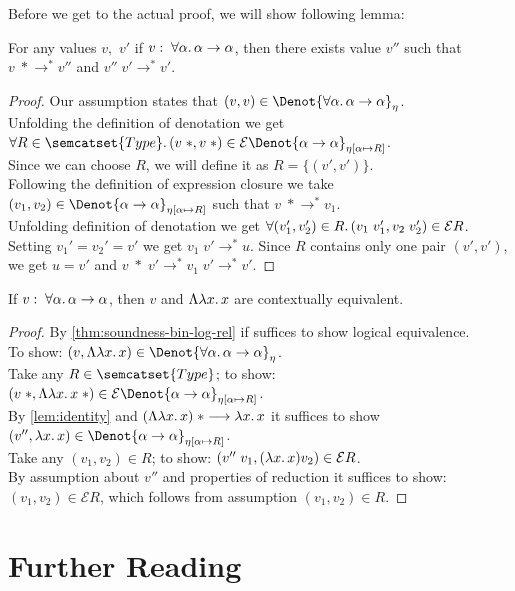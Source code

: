 Before we get to the actual proof, we will show following lemma:
\begin{lemma}\label{lem:identity}
  For any values $v,$ $v'$ if $v:\; \forall\alpha\ldotp \alpha \to \alpha$,
  then there exists value $v''$ such that $v\;* \longrightarrow^* v''$ and
  $v'' \; v' \longrightarrow^* v'$.
\end{lemma}
\begin{proof}
  Our assumption states that
    $(v, v) \in \Denot{\forall\alpha\ldotp\alpha\to\alpha}_\eta$.\\
  Unfolding the definition of denotation we get\\
  $\forall R\in\semcatset{Type}\ldotp (v\;*, v\;*) \in
    \mathcal E \Denot{\alpha \to \alpha}_{\eta[\alpha\mapsto R]}$.\\
  Since we can choose $R$, we will define it as $R = \{(v', v')\}$.\\
  Following the definition of expression closure we take\\
  $(v_1, v_2) \in \Denot{\alpha \to \alpha}_{\eta[\alpha \mapsto R]}$
    such that $v\;* \longrightarrow^* v_1$.\\
  Unfolding definition of denotation we get
    $\forall(v_1', v_2')\in R\ldotp (v_1\; v_1', v_2\; v_2')\in\mathcal E R$.\\
  Setting $v_1' = v_2' = v'$ we get $v_1 \;v' \longrightarrow^* u$.
    Since $R$ contains only one pair $(v',v')$,\\
  we get $u=v'$ and
    $v\;*\; v'\longrightarrow^* v_1\; v' \longrightarrow^* v'$.
\end{proof}

\begin{theorem}
  If $v:\; \forall\alpha\ldotp\alpha\to\alpha$, then
  $v$ and $\Lambda\lambda x\ldotp x$ are contextually equivalent.
\end{theorem}
\begin{proof}
  By \autoref{thm:soundness-bin-log-rel}
    if suffices to show logical equivalence.\\
  To show: $(v, \Lambda\lambda x\ldotp x) \in
    \Denot{\forall\alpha\ldotp\alpha\to\alpha}_\eta$.\\
  Take any $R \in \semcatset{Type}$;
    to show: $(v\; *, \Lambda\lambda x\ldotp x\;*) \in
      \mathcal E\Denot{\alpha\to\alpha}_{\eta[\alpha\mapsto R]}$.\\
  By \autoref{lem:identity} and
    $(\Lambda\lambda x\ldotp x)\;* \longrightarrow \lambda x\ldotp x$
      it suffices to show \\
  $(v'', \lambda x\ldotp x )\in
    \Denot{\alpha\to\alpha}_{\eta[\alpha \mapsto R]}$.\\
  Take any $(v_1, v_2) \in R$;
    to show: $(v''\; v_1, (\lambda x\ldotp x) v_2) \in \mathcal E R$.\\
  By assumption about $v''$ and properties of reduction it suffices to show:\\
  $(v_1, v_2) \in \mathcal E R$,
    which follows from assumption $(v_1, v_2) \in R$.
\end{proof}

\section{Further Reading}

